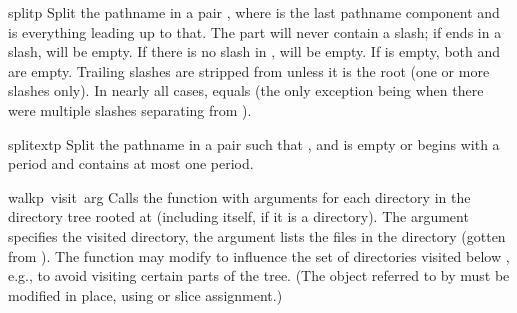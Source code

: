\begin{funcdesc}{split}{p}
Split the pathname  in a pair ,
where  is the last pathname component and  is
everything leading up to that.  The  part will never contain
a slash; if  ends in a slash,  will be empty.  If
there is no slash in ,  will be empty.  If  is
empty, both  and  are empty.  Trailing slashes are
stripped from  unless it is the root (one or more slashes
only).  In nearly all cases, 
equals  (the only exception being when there were multiple
slashes separating  from ).
\end{funcdesc}

\begin{funcdesc}{splitext}{p}
Split the pathname  in a pair 
such that ,
and  is empty or begins with a period and contains
at most one period.
\end{funcdesc}

\begin{funcdesc}{walk}{p\, visit\, arg}
Calls the function  with arguments
 for each directory in the
directory tree rooted at  (including  itself, if it is a
directory).  The argument  specifies the visited directory,
the argument  lists the files in the directory (gotten from
).
The  function may modify  to
influence the set of directories visited below , e.g., to
avoid visiting certain parts of the tree.  (The object referred to by
 must be modified in place, using  or slice
assignment.)
\end{funcdesc}
